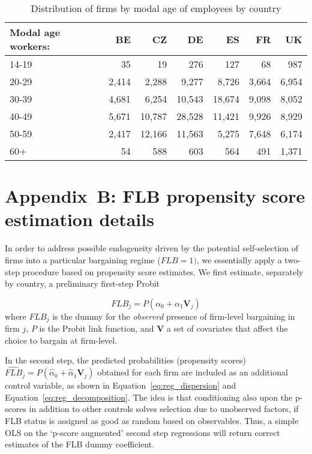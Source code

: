 \documentclass[12pt]{article}
\begin{document}
\begin{table}[ht]
\caption{Distribution of firms by modal age of employees by country}
\label{tab:sum_reg_var_mod_age}
\centering
\small
\begin{tabular}{lrrrrrr}
\toprule
Modal age workers: & BE    & CZ     & DE     & ES     & FR    & UK    \\
\midrule
14-19              & 35    & 19     & 276    & 127    & 68    & 987   \\
20-29              & 2,414 & 2,288  & 9,277  & 8,726  & 3,664 & 6,954 \\
30-39              & 4,681 & 6,254  & 10,543 & 18,674 & 9,098 & 8,052 \\
40-49              & 5,671 & 10,787 & 28,528 & 11,421 & 9,926 & 8,929 \\
50-59              & 2,417 & 12,166 & 11,563 & 5,275  & 7,648 & 6,174 \\
60+                & 54    & 588    & 603    & 564    & 491   & 1,371 \\
\bottomrule
\end{tabular}
\end{table}

\clearpage

\section*{Appendix~B: FLB propensity score estimation details}
\noindent In order to address possible endogeneity driven by the potential self-selection of firms into a particular bargaining regime ($\mathit{FLB}=1)$, we essentially apply a two-step procedure based on propensity score estimates. We first estimate, separately by country, a preliminary first-step Probit

\begin{equation}
\label{eq:reg_propensity}
  \mathit{FLB}_j = \mathit{P}\left( \alpha_0 + \alpha_1\mathbf{V}_j \right)
\end{equation}
where $\mathit{FLB}_j$ is the dummy for the \emph{observed} presence of firm-level bargaining in firm $j$, $\mathit{P}$ is the Probit link function, and $\mathbf{V}$ a set of covariates that affect the choice to bargain at firm-level.

In the second step, the predicted probabilities (propensity scores)
$\widehat{\mathit{FLB}}_j = \mathit{P}\left( \hat{\alpha}_0 +
  \hat{\alpha}_1\mathbf{V}_j \right)$ obtained for each firm are included
as an additional control variable, as shown in Equation~\ref{eq:reg_dispersion} and Equation~\ref{eq:reg_decomposition}. The idea is that conditioning also upon the p-scores in addition to other controls solves selection due to unobserved factors, if FLB status is assigned as good as random based on observables. Thus, a simple OLS on the ‘p-score augmented’ second step regressions will return correct estimates of the FLB dummy coefficient.
\end{document}
